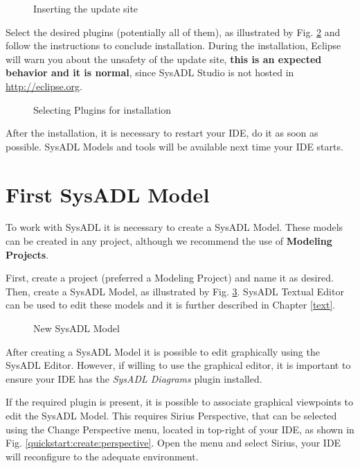 \begin{figure}
	\caption{\label{quickstart:install:site}Inserting the update site}
\end{figure}

Select the desired plugins (potentially all of them), as illustrated by Fig. \ref{quickstart:install:plugins} and follow the instructions to conclude installation. During the installation, Eclipse will warn you about the unsafety of the update site, \textbf{this is an expected behavior and it is normal}, since SysADL Studio is not hosted in \url{http://eclipse.org}.

\begin{figure}
	\caption{\label{quickstart:install:plugins}Selecting Plugins for installation}
\end{figure}

After the installation, it is necessary to restart your IDE, do it as soon as possible. SysADL Models and tools will be available next time your IDE starts.

\section{First SysADL Model}
To work with SysADL it is necessary to create a SysADL Model. These models can be created in any project, although we recommend the use of \textbf{Modeling Projects}.

First, create a project (preferred a Modeling Project) and name it as desired. Then, create a SysADL Model, as illustrated by Fig. \ref{quickstart:create:model}. SysADL Textual Editor can be used to edit these models and it is further described in Chapter \ref{text}.

\begin{figure}
	\caption{\label{quickstart:create:model}New SysADL Model}
\end{figure}

After creating a SysADL Model it is possible to edit graphically using the SysADL Editor. However, if willing to use the graphical editor, it is important to ensure your IDE has the \textit{SysADL Diagrams} plugin installed.

If the required plugin is present, it is possible to associate graphical viewpoints to edit the SysADL Model. This requires Sirius Perspective, that can be selected using the Change Perspective menu, located in top-right of your IDE, as shown in Fig. \ref{quickstart:create:perspective}. Open the menu and select Sirius, your IDE will reconfigure to the adequate environment.

